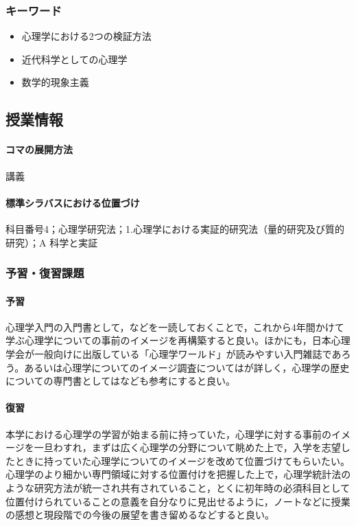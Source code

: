 \subsubsection{キーワード}
\begin{itemize}
    \item 心理学における2つの検証方法
    \item 近代科学としての心理学
    \item 数学的現象主義
\end{itemize}
\subsection{授業情報}
\paragraph{コマの展開方法}
講義
\paragraph{標準シラバスにおける位置づけ}
科目番号4；心理学研究法；1.心理学における実証的研究法（量的研究及び質的研究）；A 科学と実証
\subsubsection{予習・復習課題}
\paragraph{予習}
心理学入門の入門書として，\citet{中西201507,道又200903}などを一読しておくことで，これから4年間かけて学ぶ心理学についての事前のイメージを再構築すると良い。ほかにも，日本心理学会が一般向けに出版している「心理学ワールド」が読みやすい入門雑誌であろう。あるいは心理学についてのイメージ調査については\citet{菊池2018}が詳しく，心理学の歴史についての専門書としては\citet{大芦201610}なども参考にすると良い。
\paragraph{復習}
本学における心理学の学習が始まる前に持っていた，心理学に対する事前のイメージを一旦わすれ，まずは広く心理学の分野について眺めた上で，入学を志望したときに持っていた心理学についてのイメージを改めて位置づけてもらいたい。心理学のより細かい専門領域に対する位置付けを把握した上で，心理学統計法のような研究方法が統一され共有されていること，とくに初年時の必須科目として位置付けられていることの意義を自分なりに見出せるように，ノートなどに授業の感想と現段階での今後の展望を書き留めるなどすると良い。
